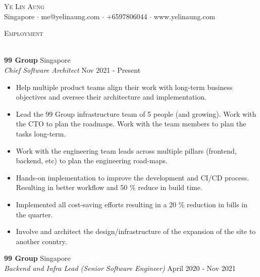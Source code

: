 \documentclass[a4paper]{article}
\newcommand{\lineunder} {
    \vspace*{-8pt} \\
    \hspace*{-18pt} \hrulefill \\
}
\newcommand{\header} [1] {
    {\hspace*{-18pt}\vspace*{6pt} \textsc{#1}}
    \vspace*{-6pt} \lineunder
}
\begin{document}
\vspace*{-40pt}

    

\vspace*{-10pt}
\begin{center}
	{\Huge \scshape {Ye Lin Aung}}\\
	Singapore $\cdot$ me@yelinaung.com $\cdot$ +6597806044 $\cdot$ www.yelinaung.com\\
\end{center}

\header{Employment}
\vspace{1mm}

\textbf{99 Group} \hfill Singapore\\
\textit{Chief Software Architect} \hfill Nov 2021 - Present\\
\vspace{-1mm}
\begin{itemize} \itemsep 1pt
	\item Help multiple product teams align their work with long-term business objectives and oversee their architecture and implementation.
	\item Lead the 99 Group infrastructure team of 5 people (and growing). Work with the CTO to plan the roadmaps. Work with the team members to plan the tasks long-term.
	\item Work with the engineering team leads across multiple pillars (frontend, backend, etc) to plan the engineering road-maps.
	\item Hands-on implementation to improve the development and CI/CD process. Resulting in better workflow and 50 \% reduce in build time.
	\item Implemented all cost-saving efforts resulting in a 20 \% reduction in bills in the quarter.
	\item Involve and architect the design/infrastructure of the expansion of the site to another country.
\end{itemize}
\textbf{99 Group} \hfill Singapore\\
\textit{Backend and Infra Lead (Senior Software Engineer)} \hfill April 2020 - Nov 2021\\
\vspace{-1mm}
\end{document}
